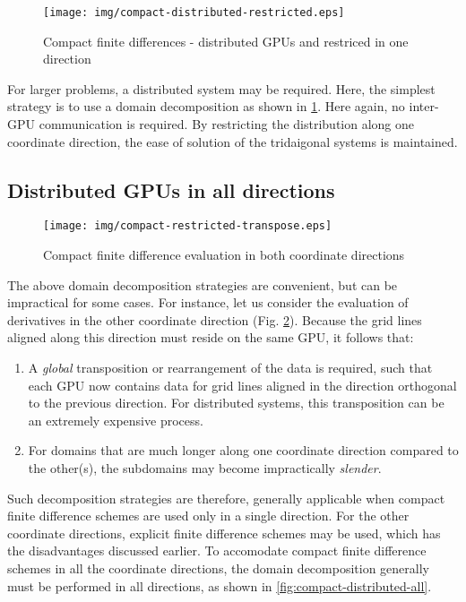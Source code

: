 \begin{figure}
\begin{center}
\texttt{[image: img/compact-distributed-restricted.eps]}
\caption{Compact finite differences - distributed GPUs and
    restriced in one direction}
\label{fig:compact-distributed-restricted}
\end{center}
\end{figure}

For larger problems,
a distributed system may be required.
Here, the simplest strategy is to use a domain decomposition
as shown in \ref{fig:compact-distributed-restricted}.
Here again, 
no inter-GPU communication is required.
By restricting the distribution along one coordinate direction,
the ease of solution of the tridaigonal systems is maintained.

\subsection{Distributed GPUs in all directions}

\begin{figure}
\begin{center}
\texttt{[image: img/compact-restricted-transpose.eps]}
\caption{Compact finite difference evaluation in both coordinate directions}
\label{fig:compact-restricted-transpose}
\end{center}
\end{figure}

The above domain decomposition strategies are convenient,
but can be impractical for some cases.
For instance,
let us consider the evaluation of derivatives
in the other coordinate direction
(Fig. \ref{fig:compact-restricted-transpose}).
Because the grid lines aligned along this direction
must reside on the same GPU,
it follows that:
%
\begin{enumerate}
    \item A \emph{global} transposition or rearrangement
        of the data is required,
        such that each GPU now contains data for
        grid lines aligned in the direction orthogonal
        to the previous direction.
        For distributed systems,
        this transposition can be an extremely expensive process.
    
    \item For domains that are much longer along one coordinate
        direction compared to the other(s),
        the subdomains may become impractically \emph{slender}.
\end{enumerate}
%
Such decomposition strategies are therefore, generally applicable
when compact finite difference schemes are used only
in a single direction.
For the other coordinate directions,
explicit finite difference schemes may be used,
which has the disadvantages discussed earlier.
To accomodate compact finite difference schemes in all the coordinate
directions,
the domain decomposition generally must be performed in all directions,
as shown in \ref{fig:compact-distributed-all}.

